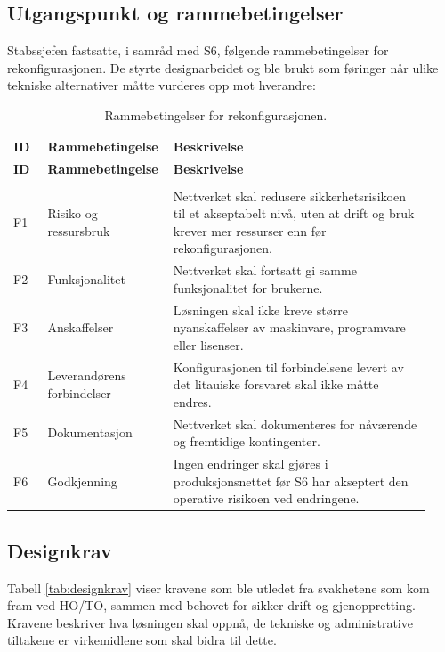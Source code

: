\subsection{Utgangspunkt og rammebetingelser}
Stabssjefen fastsatte, i samråd med S6, følgende rammebetingelser for rekonfigurasjonen. De styrte designarbeidet og ble brukt som føringer når ulike tekniske alternativer måtte vurderes opp mot hverandre:
\begingroup
\small
\setlength{\tabcolsep}{4pt}
\renewcommand{\arraystretch}{1.18}
\captionsetup{justification=centering,singlelinecheck=false}
\begin{longtable}{@{}>{\raggedright\arraybackslash}p{0.08\linewidth} >{\raggedright\arraybackslash}p{0.25\linewidth} >{\raggedright\arraybackslash}p{0.60\linewidth}@{}}
\caption{Rammebetingelser for rekonfigurasjonen.}\label{tab:rammebetingelser}\\
\toprule
\textbf{ID} & \textbf{Rammebetingelse} & \textbf{Beskrivelse} \\
\midrule
\endfirsthead
\toprule
\textbf{ID} & \textbf{Rammebetingelse} & \textbf{Beskrivelse} \\
\midrule
\endhead
\midrule
\multicolumn{3}{r}{Fortsetter på neste side}\\
\endfoot
\bottomrule
\endlastfoot
F1 & Risiko og ressursbruk & Nettverket skal redusere sikkerhetsrisikoen til et akseptabelt nivå, uten at drift og bruk krever mer ressurser enn før rekonfigurasjonen. \\
\addlinespace
F2 & Funksjonalitet & Nettverket skal fortsatt gi samme funksjonalitet for brukerne. \\
\addlinespace
F3 & Anskaffelser & Løsningen skal ikke kreve større nyanskaffelser av maskinvare, programvare eller lisenser. \\
\addlinespace
F4 & Leverandørens forbindelser & Konfigurasjonen til forbindelsene levert av det litauiske forsvaret skal ikke måtte endres. \\
\addlinespace
F5 & Dokumentasjon & Nettverket skal dokumenteres for nåværende og fremtidige kontingenter. \\
\addlinespace
F6 & Godkjenning & Ingen endringer skal gjøres i produksjonsnettet før S6 har akseptert den operative risikoen ved endringene. \\
\end{longtable}
\endgroup

\subsection{Designkrav}
Tabell \ref{tab:designkrav} viser kravene som ble utledet fra svakhetene som kom fram ved HO/TO, sammen med behovet for sikker drift og gjenoppretting. Kravene beskriver hva løsningen skal oppnå, de tekniske og administrative tiltakene er virkemidlene som skal bidra til dette.

